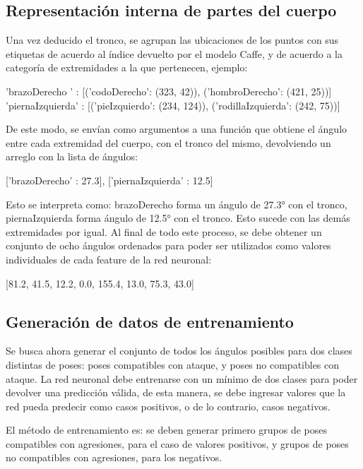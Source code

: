 \documentclass[a4paper,12pt,oneside,spanish]{book}
\begin{document}
\subsection{Representación interna de partes del cuerpo}
Una vez deducido el tronco, se agrupan las ubicaciones de los puntos con sus etiquetas de acuerdo al índice devuelto por el modelo Caffe, y de acuerdo a la categoría de extremidades a la que pertenecen, ejemplo:
\begin{center}
{\footnotesize 'brazoDerecho  ' : [('codoDerecho': (323, 42)),  ('hombroDerecho': (421, 25))]}  \\
{\footnotesize 'piernaIzquierda' : [('pieIzquierdo': (234, 124)), ('rodillaIzquierda': (242, 75))]}\\	
\end{center}

De este modo, se envían como argumentos a una función que obtiene el ángulo entre cada extremidad del cuerpo, con el tronco del mismo, devolviendo un arreglo con la lista de ángulos:
\begin{center}
	{\footnotesize ['brazoDerecho' : 27.3], ['piernaIzquierda' : 12.5]}\\	
\end{center}
Esto se interpreta como: brazoDerecho forma un ángulo de 27.3° con el tronco, piernaIzquierda forma ángulo de 12.5° con el tronco. Esto sucede con las demás extremidades por igual. Al final de todo este proceso, se debe obtener un conjunto de ocho ángulos ordenados para poder ser utilizados como valores individuales de cada feature de la red neuronal:
\begin{center}
	{\footnotesize [81.2, 41.5, 12.2, 0.0, 155.4, 13.0, 75.3, 43.0]}\\	
\end{center}

\subsection{Generación de datos de entrenamiento}
Se busca ahora generar el conjunto de todos los ángulos posibles para dos clases distintas de poses: poses compatibles con ataque, y poses no compatibles con ataque. La red neuronal debe entrenarse con un mínimo de dos clases para poder devolver una predicción válida, de esta manera, se debe ingresar valores que la red pueda predecir como casos positivos, o de lo contrario, casos negativos.\par

El método de entrenamiento es: se deben generar primero grupos de poses compatibles con agresiones, para el caso de valores positivos, y grupos de poses no compatibles con agresiones, para los negativos.\par
\end{document}
